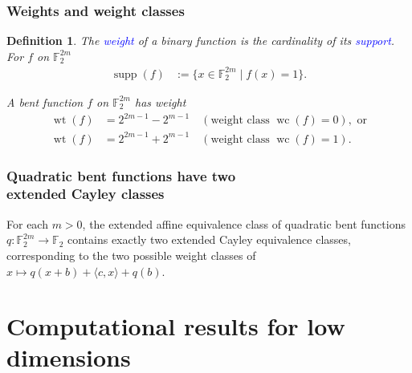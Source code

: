 \documentclass[pdf,sprung,slideColor,nocolorBG]{beamer}
\newenvironment{colortheme}[1]{
\def\ProvidesPackageRCS $##1${\relax}
\renewcommand{\ProcessOptions}{\relax}
\makeatletter

\makeatother
}{}
\newcommand{\mb}[1]{\mathbb{#1}}
\newcommand{\Emph}[1]{\emph{\textcolor{blue}{#1}}}
\newcommand{\To}{\rightarrow}
\newcommand{\Cay}[1]{\operatorname{Cay}\left(#1\right)}
\newcommand{\support}[1]{\operatorname{supp}\left(#1\right)}
\newcommand{\weight}[1]{\operatorname{wt}\left(#1\right)}
\newcommand{\weightclass}[1]{\operatorname{wc}\left(#1\right)}
\newcommand{\F}{\mb{F}}
\newtheorem{Def}{Definition}
\begin{document}
\begin{colortheme}{jubata}
\begin{frame}
\frametitle{Weights and weight classes}
\begin{Def}
The \Emph{weight} of a binary function is the cardinality of its \Emph{support}.
For $f$ on $\F_2^{2m}$
\begin{align*}
\support{f} &:= \{x \in \F_2^{2m} \mid f(x)=1 \}.
\end{align*}

A bent function $f$ on $\F_2^{2m}$ has weight
\begin{align*}
\weight{f} &= 2^{2 m - 1} - 2^{m-1} \quad (\text{weight class~} \weightclass{f}=0), \text{~or}
\\
\weight{f} &= 2^{2 m - 1} + 2^{m-1} \quad (\text{weight class~} \weightclass{f}=1).
\end{align*}
\end{Def}
\end{frame}

\begin{frame}
\frametitle{Quadratic bent functions have two \\ extended Cayley classes}
\begin{Theorem}
For each $m>0$, the extended affine equivalence class of quadratic bent functions
$q : \F_2^{2m} \To \F_2$ contains exactly two extended Cayley equivalence classes,
corresponding to the two possible weight classes of $x \mapsto q(x+b) + \langle c, x \rangle + q(b)$.
\end{Theorem}

\end{frame}

\end{colortheme}

\section{Computational results for low dimensions}
\end{document}
